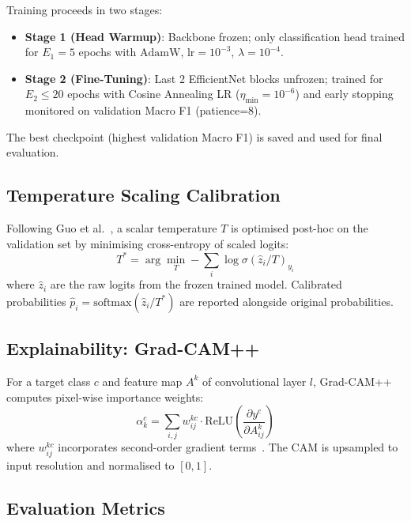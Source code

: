 \documentclass[journal]{IEEEtran}
\begin{document}
Training proceeds in two stages:
\begin{itemize}
  \item \textbf{Stage 1 (Head Warmup)}: Backbone frozen; only classification head trained for
        $E_1=5$ epochs with $\text{AdamW}$, $\text{lr}=10^{-3}$, $\lambda=10^{-4}$.
  \item \textbf{Stage 2 (Fine-Tuning)}: Last 2 EfficientNet blocks unfrozen; trained for
        $E_2 \leq 20$ epochs with Cosine Annealing LR ($\eta_{\min}=10^{-6}$) and early
        stopping monitored on validation Macro F1 (patience=8).
\end{itemize}

The best checkpoint (highest validation Macro F1) is saved and used for final evaluation.

\subsection{Temperature Scaling Calibration}

Following Guo et al.~\cite{guo2017calibration}, a scalar temperature $T$ is optimised post-hoc
on the validation set by minimising cross-entropy of scaled logits:
\begin{equation}
  T^* = \arg\min_T -\sum_i \log \sigma\!\left(\hat{z}_i / T\right)_{y_i}
\end{equation}
where $\hat{z}_i$ are the raw logits from the frozen trained model. Calibrated probabilities
$\hat{p}_i = \text{softmax}(\hat{z}_i / T^*)$ are reported alongside original probabilities.

\subsection{Explainability: Grad-CAM++}

For a target class $c$ and feature map $A^k$ of convolutional layer $l$, Grad-CAM++
computes pixel-wise importance weights:
\begin{equation}
  \alpha_k^c = \sum_{i,j} w_{ij}^{kc} \cdot \text{ReLU}\!\left(\frac{\partial y^c}{\partial A_{ij}^k}\right)
\end{equation}
where $w_{ij}^{kc}$ incorporates second-order gradient terms~\cite{chattopadhay2018gradcampp}.
The CAM is upsampled to input resolution and normalised to $[0,1]$.

\subsection{Evaluation Metrics}
\end{document}
